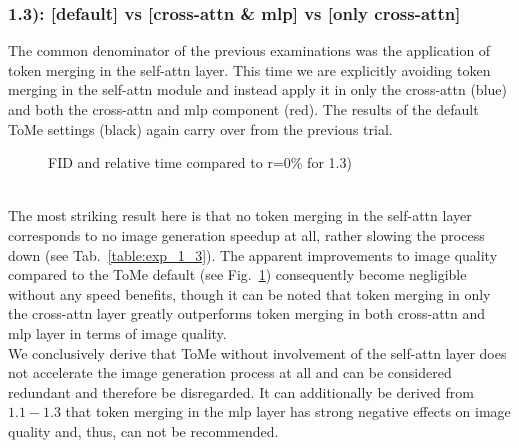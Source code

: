 \subsubsection*{1.3): [default] vs [cross-attn \& mlp] vs [only cross-attn]}
The common denominator of the previous examinations was the application of token merging in the self-attn layer. This time we are explicitly avoiding token merging in the self-attn module and instead apply it in only the cross-attn (blue) and both the cross-attn and mlp component (red).
The results of the default ToMe settings (black) again carry over from the previous trial.\\
\begin{figure}[!htb]
    
    
\caption{FID and relative time compared to r=0\% for 1.3)}
\label{fig:exp_1_3}
\end{figure}\\
The most striking result here is that no token merging in the self-attn layer corresponds to no image generation speedup at all, rather slowing the process down (see Tab.~\ref{table:exp_1_3}). 
The apparent improvements to image quality compared to the ToMe default (see Fig.~\ref{fig:exp_1_3}) consequently become negligible without any speed benefits, though it can be noted that token merging in only the cross-attn layer greatly outperforms token merging in both cross-attn and mlp layer in terms of image quality.\\
We conclusively derive that ToMe without involvement of the self-attn layer does not accelerate the image generation process at all and can be considered redundant and therefore be disregarded. It can additionally be derived from \(1.1 - 1.3\) that token merging in the mlp layer has strong negative effects on image quality and, thus, can not be recommended.




